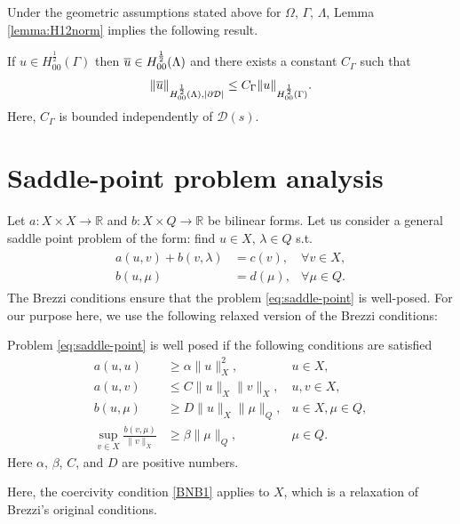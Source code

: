 \documentclass[r]{siamart171218}
\newcommand{\kent}[1]{{\color{blue}#1}}
\begin{document}
Under the geometric assumptions stated above for $\Omega,\,\Gamma,\,\Lambda$, Lemma \ref{lemma:H12norm} implies the following result.
\begin{corollary}\label{corollary:H12norm}
If $u\in H^{\frac 12}_{00}(\Gamma)$ then $\overline{u}\in H^{\frac 12}_{00}(\Lambda)$ and there exists a constant $C_\Gamma$ such that
\begin{equation*}
\|\overline{u}\|_{H^{\frac 12}_{00}(\Lambda), |\partial\mathcal{D}|} \leq C_\Gamma \|u\|_{H^{\frac 12}_{00}(\Gamma)}.
\end{equation*}
\kent{Here, $C_\Gamma$ is bounded independently of $\mathcal{D}(s)$.} 
\end{corollary}


\section{Saddle-point problem analysis}
Let $a: X \times X \rightarrow \mathbb{R}$ and $b: X\times Q \rightarrow \mathbb{R}$ be bilinear forms. Let us consider a general saddle point problem of the form: find $u\in X$, $\lambda\in Q$ s.t.
\begin{eqnarray}\label{eq:saddle-point}
\begin{aligned}
a(u,v)+b(v,\lambda)&=c(v), &\forall v\in X,\\
b(u,\mu)&=d(\mu), &\forall \mu\in Q.
\end{aligned}
\end{eqnarray}
The Brezzi conditions \cite{MR365287} ensure that the problem \eqref{eq:saddle-point} is well-posed.
For our purpose here, we use the following relaxed version of the Brezzi conditions:  
\begin{theorem}{}\label{th:bnb}
Problem \eqref{eq:saddle-point} is well posed if the following conditions are satisfied
\begin{align}\label{BNB1}
a(u,u) &\ge \alpha \|u\|^2_{X}, & u\in X,\\
\label{BNB2}
a(u,v) &\le C \|u\|_{X}\|v\|_{X}, & u,v \in X,\\
\label{BNB3}
b(u,\mu) &\ge D \|u\|_{X} \|\mu\|_{Q}, & u\in X, \mu\in Q,\\
\label{BNB4}
\sup_{v\in X} \frac{b(v,\mu)}{\|v\|_{X}} &\geq \beta\|\mu\|_{Q}, & \mu \in Q .
\end{align}
Here $\alpha$, $\beta$, $C$, and $D$ are positive numbers. 
\end{theorem} 
Here, the coercivity condition \eqref{BNB1} applies to $X$, which is a relaxation of Brezzi's original conditions.  
\end{document}
